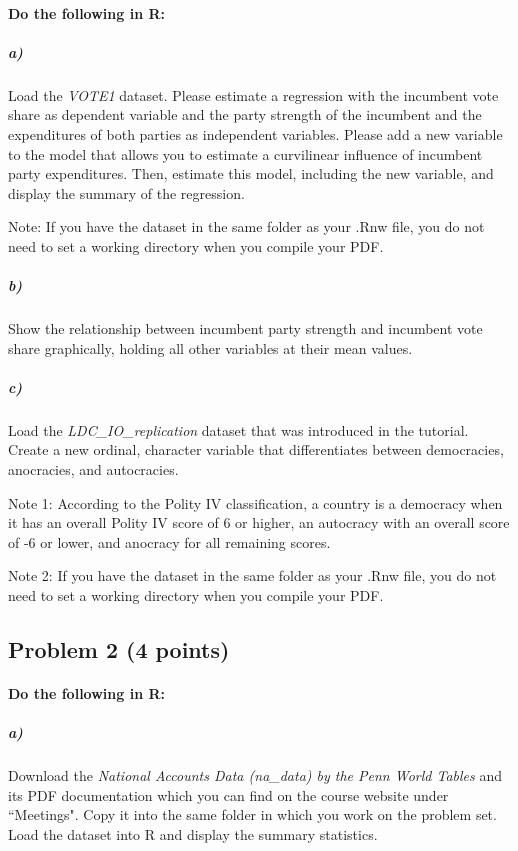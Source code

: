 \documentclass[12pt]{article}
\begin{document}
\paragraph{Do the following in R:}

\subparagraph{a)} Load the \textit{VOTE1} dataset. Please estimate a regression with the incumbent vote share as dependent variable and the party strength of the incumbent and the expenditures of both parties as independent variables. Please add a new variable to the model that allows you to estimate a curvilinear influence of incumbent party expenditures. Then, estimate this model, including the new variable, and display the summary of the regression.

Note: If you have the dataset in the same folder as your .Rnw file, you do not need to set a working directory when you compile your PDF.

\subparagraph{b)} Show the relationship between incumbent party strength and incumbent vote share graphically, holding all other variables at their mean values.

\subparagraph{c)} Load the \textit{LDC\_IO\_replication} dataset that was introduced in the tutorial. Create a new ordinal, character variable that differentiates between democracies, anocracies, and autocracies.

Note 1: According to the Polity IV classification, a country is a democracy when it has an overall Polity IV score of 6 or higher, an autocracy with an overall score of -6 or lower, and anocracy for all remaining scores.

Note 2: If you have the dataset in the same folder as your .Rnw file, you do not need to set a working directory when you compile your PDF.



\subsection*{Problem 2 (4 points)}

\paragraph{Do the following in R:}

\subparagraph{a)} Download the \textit{National Accounts Data (na\_data) by the Penn World Tables} and its PDF documentation which you can find on the course website under ``Meetings". Copy it into the same folder in which you work on the problem set. Load the dataset into R and display the summary statistics.
\end{document}
